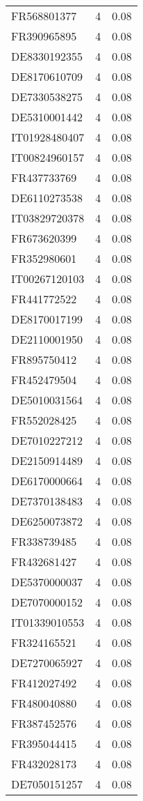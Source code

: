 \begin{table*}[htbp]
\begin{tabular}{lrr}
FR568801377 & 4 & 0.08 \\
FR390965895 & 4 & 0.08 \\
DE8330192355 & 4 & 0.08 \\
DE8170610709 & 4 & 0.08 \\
DE7330538275 & 4 & 0.08 \\
DE5310001442 & 4 & 0.08 \\
IT01928480407 & 4 & 0.08 \\
IT00824960157 & 4 & 0.08 \\
FR437733769 & 4 & 0.08 \\
DE6110273538 & 4 & 0.08 \\
IT03829720378 & 4 & 0.08 \\
FR673620399 & 4 & 0.08 \\
FR352980601 & 4 & 0.08 \\
IT00267120103 & 4 & 0.08 \\
FR441772522 & 4 & 0.08 \\
DE8170017199 & 4 & 0.08 \\
DE2110001950 & 4 & 0.08 \\
FR895750412 & 4 & 0.08 \\
FR452479504 & 4 & 0.08 \\
DE5010031564 & 4 & 0.08 \\
FR552028425 & 4 & 0.08 \\
DE7010227212 & 4 & 0.08 \\
DE2150914489 & 4 & 0.08 \\
DE6170000664 & 4 & 0.08 \\
DE7370138483 & 4 & 0.08 \\
DE6250073872 & 4 & 0.08 \\
FR338739485 & 4 & 0.08 \\
FR432681427 & 4 & 0.08 \\
DE5370000037 & 4 & 0.08 \\
DE7070000152 & 4 & 0.08 \\
IT01339010553 & 4 & 0.08 \\
FR324165521 & 4 & 0.08 \\
DE7270065927 & 4 & 0.08 \\
FR412027492 & 4 & 0.08 \\
FR480040880 & 4 & 0.08 \\
FR387452576 & 4 & 0.08 \\
FR395044415 & 4 & 0.08 \\
FR432028173 & 4 & 0.08 \\
DE7050151257 & 4 & 0.08 \\

\end{tabular}
\end{table*}
